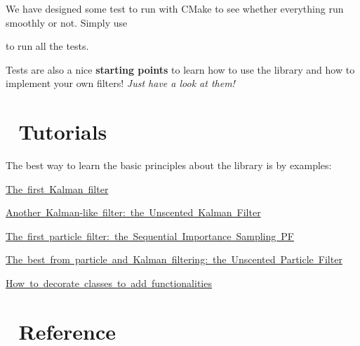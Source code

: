  We have designed some test to run with {\ttfamily C\+Make} to see whether everything run smoothly or not. Simply use 
 to run all the tests.

Tests are also a nice {\bfseries starting points} to learn how to use the library and how to implement your own filters! {\itshape Just have a look at them!}\hypertarget{index_tutorials}{}\section{📘 Tutorials}\label{index_tutorials}


 The best way to learn the basic principles about the library is by examples\+:
\begin{DoxyItemize}
\item \mbox{\hyperlink{kf}{The first Kalman filter}}
\item \mbox{\hyperlink{ukf}{Another Kalman-\/like filter\+: the Unscented Kalman Filter}}
\item \mbox{\hyperlink{sis}{The first particle filter\+: the Sequential Importance Sampling PF}}
\item \mbox{\hyperlink{upf}{The best from particle and Kalman filtering\+: the Unscented Particle Filter}}
\item \mbox{\hyperlink{decorate-classes}{How to decorate classes to add functionalities}}
\end{DoxyItemize}\hypertarget{index_reference}{}\section{📑 Reference}\label{index_reference}


